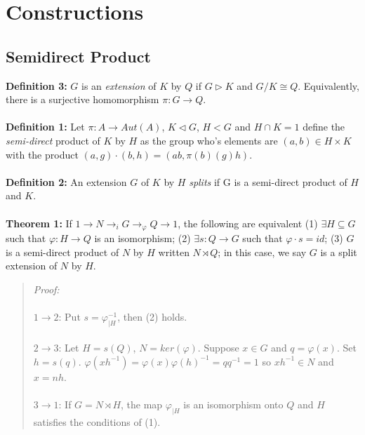 \chapter{Constructions}
\section {Semidirect Product}
{\bf Definition 3:}
$G$ is an \emph{extension} of $K$ by $Q$ if $G \triangleright K$ and $G/K \cong Q$.  Equivalently,
there is a surjective homomorphism $\pi:G \rightarrow Q$.
\\
\\
{\bf Definition 1:} 
Let $\pi: A \rightarrow Aut(A)$, $K \lhd G$, $H<G$ and $H \cap K = 1$ define the
\emph {semi-direct} product of $K$ by $H$ as the group who's elements
are $(a,b) \in H \times K$ with the product $(a, g) \cdot (b,h)= (ab, \pi(b)(g)h)$.
\\
\\
{\bf Definition 2:} An extension $G$ of $K$ by $H$ \emph {splits} if G
is a semi-direct product of $H$ and $K$.
\\
\\
{\bf Theorem 1:}
If $1 \rightarrow N \rightarrow_{i} G \rightarrow_{\varphi} Q \rightarrow 1$, the following
are equivalent
(1) $\exists H \subseteq G$ such that $\varphi: H \rightarrow Q$ is an isomorphism;
(2) $\exists s:Q \rightarrow G$ such that $\varphi \cdot s = id$;
(3) $G$ is a semi-direct product of $N$ by $H$ written $N \rtimes Q$; in this
case, we say $G$ is a split extension of $N$ by $H$.
\begin{quote}
\emph{Proof:}
\\
\\
$1 \rightarrow 2$:
Put $s= \varphi_{|H}^{-1}$, then (2) holds.
\\
\\
$2 \rightarrow 3$:
Let $H= s(Q)$, $N= ker(\varphi)$.  Suppose $x \in G$ and $q= \varphi(x)$.  Set
$h= s(q)$.  $\varphi(x h^{-1})= \varphi(x) \varphi(h)^{-1} = q q^{-1}= 1$ so
$x h^{-1} \in N$ and $x= nh$.
\\
\\
$3 \rightarrow 1$:
If $G= N \rtimes H$, the map $\varphi_{|H}$ is an isomorphism onto $Q$ and $H$ satisfies the
conditions of (1).
\end{quote}
